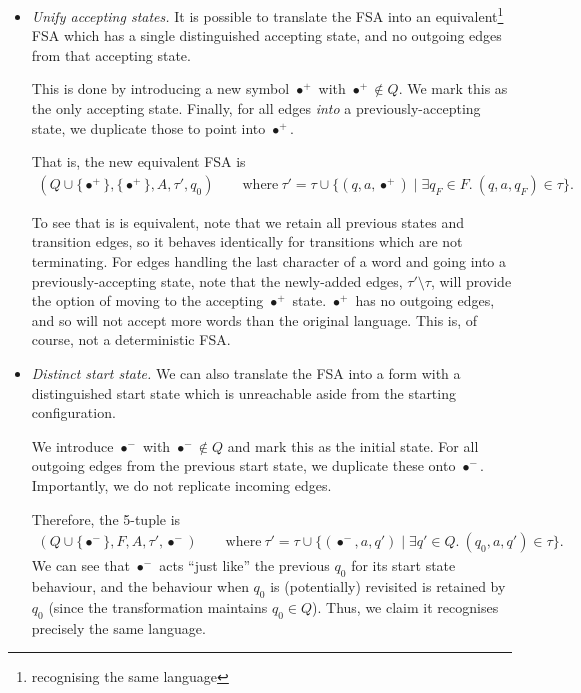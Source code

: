 \documentclass[a4paper]{article}
\begin{document}
\begin{itemize}
  \item \textit{Unify accepting states.} It is possible to translate the FSA
    into an equivalent\footnote{recognising the same language} FSA
    which has a single distinguished accepting state, and no outgoing edges from that accepting state.

    This is done by introducing a new symbol $\bullet^+$ with
    $\bullet^+ \notin Q$. We mark this as the only accepting state.
    Finally, for all edges \textit{into} a previously-accepting state, we
    duplicate those to point into $\bullet^+$.

    That is, the new equivalent FSA is
    \begin{align*}
      (Q \cup \{\bullet^+\}, \{\bullet^+\}, A, \tau', q_0)
      \qquad\text{where}~
      \tau' = \tau \cup
      \big\{(q, a, \bullet^+) \mid \exists q_F \in F.~ (q,a,q_F) \in \tau\big\}.
    \end{align*}
    
    To see that is is equivalent, note that we retain all previous states
    and transition edges, so it behaves identically for transitions which are not terminating.
    For edges handling the last character of a word and going into a
    previously-accepting state, note that the newly-added edges,
    $\tau' \setminus \tau$, will provide the option of moving to the accepting
    $\bullet^+$ state.
    $\bullet^+$ has no outgoing edges, and so will not accept more words than the original language.
    This is, of course, not a deterministic FSA.

  \item \textit{Distinct start state.}
    We can also translate the FSA into a form with a distinguished start state
    which is unreachable aside from the starting configuration.

    We introduce $\bullet^-$ with $\bullet^- \notin Q$ and mark this as the initial state.
    For all outgoing edges from the previous start state, we duplicate these onto $\bullet^-$. Importantly, we do not replicate incoming edges.

    Therefore, the 5-tuple is
    \begin{align*}
      (Q \cup \{\bullet^-\}, F, A, \tau', \bullet^-)
      \qquad\text{where}~
      \tau' = \tau \cup 
      \big\{(\bullet^-, a, q') \mid \exists q' \in Q.~ (q_0, a, q') \in \tau\big\}.
    \end{align*}
    We can see that $\bullet^-$ acts ``{just like}'' the previous $q_0$ for its
    start state behaviour, and the behaviour when $q_0$ is (potentially) revisited is retained by $q_0$ (since the transformation maintains $q_0 \in Q$).
    Thus, we claim it recognises precisely the same language.
\end{itemize}
\end{document}
